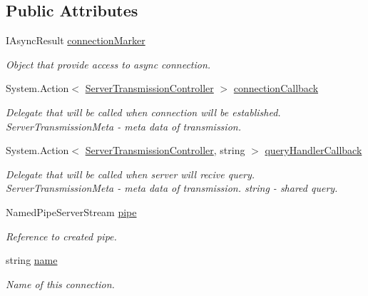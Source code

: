 \subsection*{Public Attributes}
\begin{DoxyCompactItemize}
\item 
I\+Async\+Result \mbox{\hyperlink{class_pipes_provider_1_1_server_1_1_server_transmission_controller_a6b9961d3fbf62a102b63de402aed5516}{connection\+Marker}}
\begin{DoxyCompactList}\small\item\em Object that provide access to async connection. \end{DoxyCompactList}\item 
System.\+Action$<$ \mbox{\hyperlink{class_pipes_provider_1_1_server_1_1_server_transmission_controller}{Server\+Transmission\+Controller}} $>$ \mbox{\hyperlink{class_pipes_provider_1_1_server_1_1_server_transmission_controller_a618854b229e8b0c8f98ce02985e576c7}{connection\+Callback}}
\begin{DoxyCompactList}\small\item\em Delegate that will be called when connection will be established. Server\+Transmission\+Meta -\/ meta data of transmission. \end{DoxyCompactList}\item 
System.\+Action$<$ \mbox{\hyperlink{class_pipes_provider_1_1_server_1_1_server_transmission_controller}{Server\+Transmission\+Controller}}, string $>$ \mbox{\hyperlink{class_pipes_provider_1_1_server_1_1_server_transmission_controller_a05c4175dad51cde531703ba9ed4fc8ea}{query\+Handler\+Callback}}
\begin{DoxyCompactList}\small\item\em Delegate that will be called when server will recive query. Server\+Transmission\+Meta -\/ meta data of transmission. string -\/ shared query. \end{DoxyCompactList}\item 
Named\+Pipe\+Server\+Stream \mbox{\hyperlink{class_pipes_provider_1_1_server_1_1_server_transmission_controller_a221ea11d175f2ecde78419322df272de}{pipe}}
\begin{DoxyCompactList}\small\item\em Reference to created pipe. \end{DoxyCompactList}\item 
string \mbox{\hyperlink{class_pipes_provider_1_1_server_1_1_server_transmission_controller_a3bdd20927be4076f3236d22333d858e6}{name}}
\begin{DoxyCompactList}\small\item\em Name of this connection. \end{DoxyCompactList}\end{DoxyCompactItemize}
